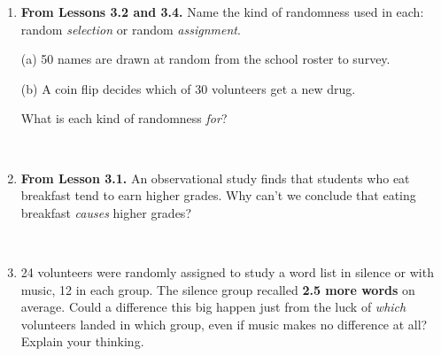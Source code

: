 \documentclass[12pt]{article}
\begin{document}

\vspace{0.28in}

\begin{enumerate}[leftmargin=1.9em, itemsep=0.42in]

  \item \textbf{From Lessons 3.2 and 3.4.} Name the kind of randomness used in each: random
        \emph{selection} or random \emph{assignment}.

        \vspace{10pt}
        (a) 50 names are drawn at random from the school roster to survey. \hfill {}

        \vspace{10pt}
        (b) A coin flip decides which of 30 volunteers get a new drug. \hfill {}

        \vspace{12pt}
        What is each kind of randomness \emph{for}?
        \vspace{12pt}

        \\[18pt]

  \item \textbf{From Lesson 3.1.} An observational study finds that students who eat breakfast
        tend to earn higher grades. Why can't we conclude that eating breakfast \emph{causes}
        higher grades?

        \vspace{12pt}
        \\[18pt]

  \item 24 volunteers were randomly assigned to study a word list in silence or with music, 12
        in each group. The silence group recalled \textbf{2.5 more words} on average. Could a
        difference this big happen just from the luck of \emph{which} volunteers landed in
        which group, even if music makes no difference at all? Explain your thinking.

        \vspace{12pt}
        \\[18pt]\\[18pt]

\end{enumerate}
\end{document}
